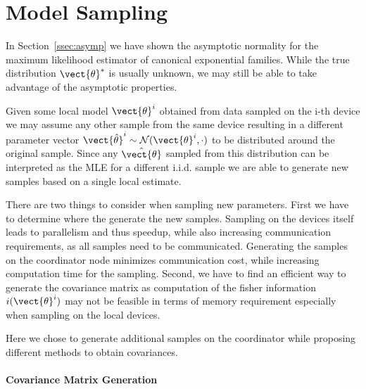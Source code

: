 \section{Model Sampling}
In Section~\ref{ssec:asymp} we have shown the asymptotic normality for the maximum likelihood estimator of canonical exponential families.
While the true distribution \wrt $\vect{\theta}^*$ is usually unknown, we may still be able to take advantage of the asymptotic properties. 

Given some local model $\vect{\theta}^i$ obtained from data sampled on the i-th device we may assume any other sample from the same device resulting in a different parameter vector $\vect{\hat{\theta}}^i \sim \mathcal{N}(\vect{\theta}^i, \cdot)$ to be distributed around the original sample. 
Since any $\hat{\vect{\theta}}$ sampled from this distribution can be interpreted as the MLE for a different i.i.d. sample we are able to generate new samples based on a single local estimate.

There are two things to consider when sampling new parameters.
First we have to determine where the generate the new samples.
Sampling on the devices itself leads to parallelism and thus speedup, while also increasing communication requirements, as all samples need to be communicated.
Generating the samples on the coordinator node minimizes communication cost, while increasing computation time for the sampling. 
Second, we have to find an efficient way to generate the covariance matrix as computation of the fisher information $i(\vect{\theta}^i)$ may not be feasible in terms of memory requirement especially when sampling on the local devices.

Here we chose to generate additional samples on the coordinator while proposing different methods to obtain covariances.

\paragraph*{Covariance Matrix Generation}


